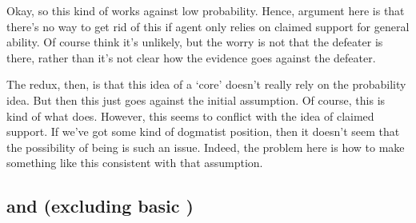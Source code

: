 \begin{note}
  Okay, so this kind of works against low probability.
  Hence, argument here is that there's no way to get rid of this \requ{} if agent only relies on claimed support for general ability.
  Of course think it's unlikely, but the worry is not that the defeater is there, rather than it's not clear how the evidence goes against the defeater.

  The redux, then, is that this idea of a `core' doesn't really rely on the probability idea.
  But then this just goes against the initial assumption.
  Of course, this is kind of what \citeauthor{Pryor:2000tl} does.
  However, this seems to conflict with the idea of claimed support.
  If we've got some kind of dogmatist position, then it doesn't seem that the possibility of being \mom{} is such an issue.
  Indeed, the problem here is how to make something like this consistent with that assumption.
\end{note}

\subsection{\nI{} and \adB{} (excluding basic \AR{})}
\label{sec:ni-ability:adB}

